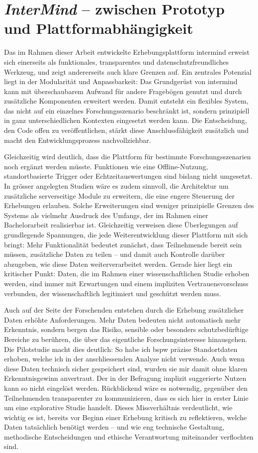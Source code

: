 \section{\textit{InterMind} -- zwischen Prototyp und Plattformabhängigkeit}

Das im Rahmen dieser Arbeit entwickelte Erhebungsplattform \gls{intermind} erweist sich einerseits als funktionales, transparentes und datenschutzfreundliches Werkzeug, und zeigt andererseits auch klare Grenzen auf. Ein zentrales Potenzial liegt in der Modularität und Anpassbarkeit: Das Grundgerüst von \gls{intermind} kann mit überschaubarem Aufwand für andere Fragebögen genutzt und durch zusätzliche Komponenten erweitert werden. Damit entsteht ein flexibles System, das nicht auf ein einzelnes Forschungsszenario beschränkt ist, sondern prinzipiell in ganz unterschiedlichen Kontexten eingesetzt werden kann. Die Entscheidung, den Code offen zu veröffentlichen, stärkt diese Anschlussfähigkeit zusätzlich und macht den Entwicklungsprozess nachvollziehbar.

Gleichzeitig wird deutlich, dass die Plattform für bestimmte Forschungsszenarien noch ergänzt werden müsste. Funktionen wie eine Offline-Nutzung, standortbasierte Trigger oder Echtzeitauswertungen sind bislang nicht umgesetzt. In grösser angelegten Studien wäre es zudem sinnvoll, die Architektur um zusätzliche serverseitige Module zu erweitern, die eine engere Steuerung der Erhebungen erlauben. Solche Erweiterungen sind weniger prinzipielle Grenzen des Systems als vielmehr Ausdruck des Umfangs, der im Rahmen einer Bachelorarbeit realisierbar ist. Gleichzeitig verweisen diese Überlegungen auf grundlegende Spannungen, die jede Weiterentwicklung dieser Plattform mit sich bringt: Mehr Funktionalität bedeutet zunächst, dass Teilnehmende bereit sein müssen, zusätzliche Daten zu teilen -- und damit auch Kontrolle darüber abzugeben, wie diese Daten weiterverarbeitet werden. Gerade hier liegt ein kritischer Punkt: Daten, die im Rahmen einer wissenschaftlichen Studie erhoben werden, sind immer mit Erwartungen und einem impliziten Vertrauensvorschuss verbunden, der wissenschaftlich legitimiert und geschützt werden muss.

Auch auf der Seite der Forschenden entstehen durch die Erhebung zusätzlicher Daten erhöhte Anforderungen. Mehr Daten bedeuten nicht automatisch mehr Erkenntnis, sondern bergen das Risiko, sensible oder besonders schutzbedürftige Bereiche zu berühren, die über das eigentliche Forschungsinteresse hinausgehen. Die Pilotstudie macht dies deutlich: So habe ich \gls{bspw} präzise Standortdaten erhoben, welche ich in der anschliessenden Analyse nicht verwende. Auch wenn diese Daten technisch sicher gespeichert sind, wurden sie mir damit ohne klaren Erkenntnisgewinn anvertraut. Der in der Befragung implizit suggerierte Nutzen kann so nicht eingelöst werden. Rückblickend wäre es notwendig, gegenüber den Teilnehmenden transparenter zu kommunizieren, dass es sich hier in erster Linie um eine explorative Studie handelt. Dieses Missverhältnis verdeutlicht, wie wichtig es ist, bereits vor Beginn einer Erhebung kritisch zu reflektieren, welche Daten tatsächlich benötigt werden -- und wie eng technische Gestaltung, methodische Entscheidungen und ethische Verantwortung miteinander verflochten sind.

